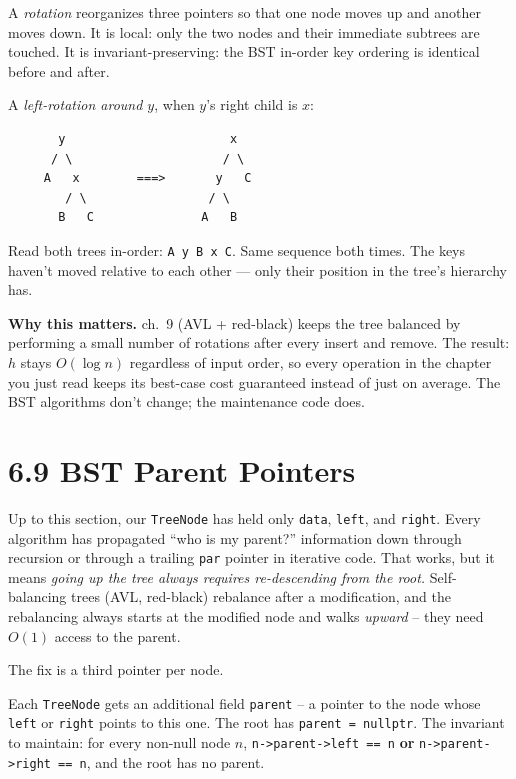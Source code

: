 \documentclass[11pt]{article}
\begin{document}
\begin{defnbox}
A \emph{rotation} reorganizes three pointers so that one node moves
up and another moves down. It is local: only the two nodes and
their immediate subtrees are touched. It is invariant-preserving:
the BST in-order key ordering is identical before and after.

A \emph{left-rotation around $y$}, when $y$'s right child is $x$:
\begin{verbatim}
       y                       x
      / \                     / \
     A   x        ===>       y   C
        / \                 / \
       B   C               A   B
\end{verbatim}
Read both trees in-order: \texttt{A y B x C}. Same sequence both
times. The keys haven't moved relative to each other --- only their
position in the tree's hierarchy has.

\textbf{Why this matters.} ch.~9 (AVL + red-black) keeps the tree
balanced by performing a small number of rotations after every
insert and remove. The result: $h$ stays $O(\log n)$ regardless of
input order, so every operation in the chapter you just read keeps
its best-case cost guaranteed instead of just on average. The BST
algorithms don't change; the maintenance code does.
\end{defnbox}

\section{6.9 BST Parent Pointers}

Up to this section, our \texttt{TreeNode} has held only \texttt{data}, \texttt{left}, and \texttt{right}. Every algorithm has propagated ``who is my parent?'' information down through recursion or through a trailing \texttt{par} pointer in iterative code. That works, but it means \emph{going up the tree always requires re-descending from the root.} Self-balancing trees (AVL, red-black) rebalance after a modification, and the rebalancing always starts at the modified node and walks \emph{upward} -- they need $O(1)$ access to the parent.

The fix is a third pointer per node.

\begin{defnbox}
Each \texttt{TreeNode} gets an additional field \texttt{parent} -- a pointer to the node whose \texttt{left} or \texttt{right} points to this one. The root has \texttt{parent = nullptr}. The invariant to maintain: for every non-null node $n$, \texttt{n->parent->left == n} \textbf{or} \texttt{n->parent->right == n}, and the root has no parent.
\end{defnbox}
\end{document}
